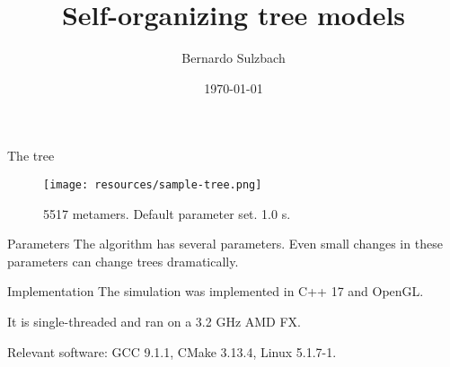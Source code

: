 \documentclass{beamer}
\title{Self-organizing tree models}
\author{Bernardo Sulzbach}
\date{\today}
\begin{document}
\begin{frame}
\titlepage
\end{frame}

\begin{frame}{The tree}
\begin{figure}
\texttt{[image: resources/sample-tree.png]}
\caption{5517 metamers. Default parameter set. 1.0 s.}
\end{figure}

\end{frame}

\begin{frame}{Parameters}
The algorithm has several parameters. Even small changes in these parameters can change trees dramatically.
\begin{table}
\end{table}
\end{frame}

\begin{frame}{Implementation}
The simulation was implemented in C++ 17 and OpenGL.

It is single-threaded and ran on a 3.2 GHz AMD FX.

Relevant software: GCC 9.1.1, CMake 3.13.4, Linux 5.1.7-1.

\end{frame}
\end{document}
